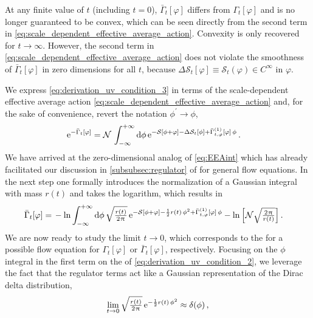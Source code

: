 At any finite value of $t$ (including $t=0$), $\bar{\Gamma}_t [ \varphi ]$ differs from $\Gamma_t [ \varphi ]$ and is no longer guaranteed to be convex, which can be seen directly from the second term in \cref{eq:scale_dependent_effective_average_action}.
Convexity is only recovered for $t \rightarrow \infty$.
However, the second term in \cref{eq:scale_dependent_effective_average_action} does not violate the smoothness of $\bar{\Gamma}_t[\varphi]$ in zero dimensions for all $t$, because $\Delta \mathcal{S}_t [\varphi] \equiv \mathcal{S}_t (\varphi) \in C^\infty$ in $\varphi$.

We express \cref{eq:derivation_uv_condition_3} in terms of the scale-dependent effective average action \eqref{eq:scale_dependent_effective_average_action} and, for the sake of convenience, revert the notation $\phi^\prime \rightarrow \phi$,
\begin{align}
	& \eu^{- \bar{\Gamma}_t [ \varphi ]} =	\mathcal{N} \, \int_{-\infty}^{+\infty} \dif \phi \, \eu^{ - \mathcal{S} [ \phi + \varphi ] - \Delta \mathcal{S}_t [ \phi ] + \bar{\Gamma}^{(1)}_{t, \varphi} [ \varphi ] \, \phi } \, .	\label{eq:exp_gamma_bar_int}
\end{align}
We have arrived at the zero-dimensional analog of \cref{eq:EEAint} which has already facilitated our discussion in \cref{subsubsec:regulator} of \ics{} for general \frg{} flow equations.
In the next step one formally introduces the normalization of a Gaussian integral with mass $r ( t )$ and takes the logarithm, which results in
\begin{align}
	\bar{\Gamma}_t [ \varphi ] = \, & - \ln \int_{-\infty}^{+\infty} \dif \phi \, \sqrt{\tfrac{r ( t )}{2 \piu}} \, \eu^{ - \mathcal{S} [ \phi + \varphi ] - \frac{1}{2} r ( t ) \, \phi^2 + \bar{\Gamma}^{(1)}_{t, \varphi} [ \varphi ] \, \phi} - \ln \Big[ \mathcal{N} \sqrt{\tfrac{2\piu}{r ( t )}} \Big] \, . \label{eq:derivation_uv_condition_2}
\end{align}
We are now ready to study the limit $t \rightarrow 0$, which corresponds to the \ic{} for a possible flow equation for $\Gamma_t [ \varphi ]$ or $\bar{\Gamma}_t [ \varphi ]$, respectively.
Focusing on the $\phi$ integral in the first term on the \rhs{} of \cref{eq:derivation_uv_condition_2}, we leverage the fact that the regulator terms act like a Gaussian representation of the Dirac delta distribution,
\begin{align}
	\lim\limits_{t \rightarrow 0} \sqrt{\tfrac{r ( t )}{2\mkern1.0mu\uppi\mkern1.0mu}} \, \mathrm{e}^{- \frac{1}{2} r ( t ) \, \phi^2} \approx \delta (\phi) \, ,	\label{eq:delta_distribution}
\end{align}
